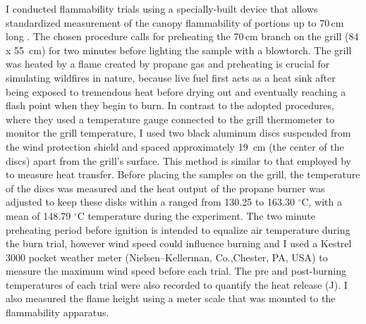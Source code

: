 \documentclass{ttuthes2007}
\begin{document}
I conducted flammability trials using a specially-built device that allows standardized measurement of the canopy flammability of portions up to 70\,cm long \citep{jaureguiberry2011device}. The chosen procedure calls for preheating the 70\,cm branch on the grill (84 x 55 \,cm) for two minutes before lighting the sample with a blowtorch. The grill was heated by a flame created by propane gas and preheating is crucial for simulating wildfires in nature, because live fuel first acts as a heat sink after being exposed to tremendous heat before drying out and eventually reaching a flash point when they begin to burn. In contrast to the adopted procedures, where they used a temperature gauge connected to the grill thermometer to monitor the grill temperature, I used two black aluminum discs  suspended from the wind protection shield and spaced approximately 19 \,cm (the center of the discs) apart from the grill's surface. This method is similar to that employed by \citet{gao2022burn} to measure heat transfer. Before placing the samples on the grill, the temperature of the discs was measured and the heat output of the propane burner was adjusted to keep these disks within a ranged from 130.25 to 163.30 $^{\circ}$C, with a mean of 148.79 $^{\circ}$C temperature  during the experiment. The two minute preheating period before ignition is intended to equalize air temperature during the burn trial, however wind speed could influence burning and I used
a Kestrel 3000 pocket weather meter (Nielsen–Kellerman, Co.,Chester, PA, USA) to
measure the maximum wind speed before each trial. 
The pre and post-burning temperatures of each trial were also recorded to quantify the heat release (J). I also measured the flame height using a meter scale that was mounted to the flammability apparatus.

\end{document}
